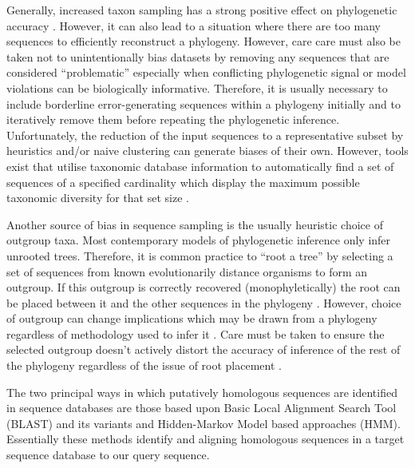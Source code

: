 Generally, increased taxon sampling has a strong positive effect on phylogenetic accuracy \citep{Zwickl2002}.
However, it can also lead to a situation where there are too many sequences to efficiently
reconstruct a phylogeny.
However, care care must also be taken not to unintentionally bias datasets by removing 
any sequences that are considered ``problematic'' especially when conflicting phylogenetic signal
or model violations can be biologically informative.  Therefore, it is usually necessary to include
borderline error-generating sequences within a phylogeny initially and to iteratively remove them 
before repeating the phylogenetic inference.  Unfortunately, the reduction of the input sequences
to a representative subset by heuristics and/or naive clustering can generate
biases of their own.  However, tools exist that utilise taxonomic database 
information to automatically find a set of sequences of a specified cardinality 
which display the maximum possible taxonomic diversity for that set size \citep{Zhou2014}.


Another source of bias in sequence sampling is the usually heuristic choice
of outgroup taxa. Most contemporary models of phylogenetic inference only infer unrooted trees. 
Therefore, it is common practice to ``root a tree'' by selecting a set of sequences from known evolutionarily distance
organisms to form an outgroup. If this outgroup is correctly recovered (monophyletically) the root can be placed between
it and the other sequences in the phylogeny \citep{Yang2012}.  
However, choice of outgroup can change implications which may be drawn from
a phylogeny regardless of methodology used to infer it \citep{Milinkovitch1996}.
Care must be taken to ensure the selected outgroup doesn't actively
distort the accuracy of inference of the rest of the phylogeny regardless
of the issue of root placement \citep{Milinkovitch1998}.

The two principal ways in which putatively homologous sequences are identified in
sequence databases are those based upon Basic Local Alignment Search Tool (BLAST) and
its variants and Hidden-Markov Model based approaches (HMM).
Essentially these methods identify and aligning homologous sequences in 
a target sequence database to our query sequence.

